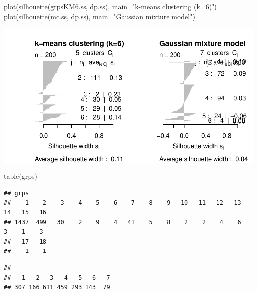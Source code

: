 \documentclass[
]{article}
\newenvironment{Shaded}{\begin{snugshade}}{\end{snugshade}}
\newcommand{\AttributeTok}[1]{\textcolor[rgb]{0.77,0.63,0.00}{#1}}
\newcommand{\FunctionTok}[1]{\textcolor[rgb]{0.00,0.00,0.00}{#1}}
\newcommand{\NormalTok}[1]{#1}
\newcommand{\SpecialCharTok}[1]{\textcolor[rgb]{0.00,0.00,0.00}{#1}}
\newcommand{\StringTok}[1]{\textcolor[rgb]{0.31,0.60,0.02}{#1}}
\begin{document}
\begin{Shaded}
\begin{Highlighting}[]
\FunctionTok{plot}\NormalTok{(}\FunctionTok{silhouette}\NormalTok{(grpsKM6.ss, dp.ss), }\AttributeTok{main=}\StringTok{"k{-}means clustering (k=6)"}\NormalTok{)}
\FunctionTok{plot}\NormalTok{(}\FunctionTok{silhouette}\NormalTok{(mc.ss, dp.ss), }\AttributeTok{main=}\StringTok{"Gaussian mixture model"}\NormalTok{)}
\end{Highlighting}
\end{Shaded}

\includegraphics{Influence_factors_files/figure-latex/3.11_ca_comparison_munic-3.pdf}

\begin{Shaded}
\begin{Highlighting}[]
\FunctionTok{table}\NormalTok{(grps)}
\end{Highlighting}
\end{Shaded}

\begin{verbatim}
## grps
##    1    2    3    4    5    6    7    8    9   10   11   12   13   14   15   16 
## 1437  499   30    2    9    4   41    5    8    2    2    4    6    3    1    3 
##   17   18 
##    1    1
\end{verbatim}

\begin{Shaded}
\end{Shaded}

\begin{verbatim}
## 
##   1   2   3   4   5   6   7 
## 307 166 611 459 293 143  79
\end{verbatim}
\end{document}
